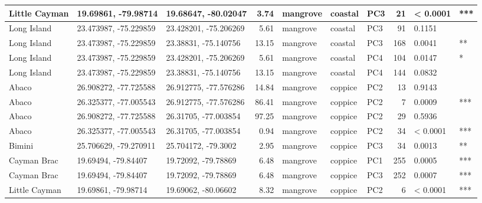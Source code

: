 \begin{tabular}{l|l|l|r|l|l|l|r|l|l}
\hline
Little Cayman & 19.69861, -79.98714 & 19.68647, -80.02047 & 3.74 & mangrove & coastal & PC3 & 21 & < 0.0001 & ***\\
\hline
Long Island & 23.473987, -75.229859 & 23.428201, -75.206269 & 5.61 & mangrove & coastal & PC3 & 91 & 0.1151 & \\
\hline
Long Island & 23.473987, -75.229859 & 23.38831, -75.140756 & 13.15 & mangrove & coastal & PC3 & 168 & 0.0041 & **\\
\hline
Long Island & 23.473987, -75.229859 & 23.428201, -75.206269 & 5.61 & mangrove & coastal & PC4 & 104 & 0.0147 & *\\
\hline
Long Island & 23.473987, -75.229859 & 23.38831, -75.140756 & 13.15 & mangrove & coastal & PC4 & 144 & 0.0832 & \\
\hline
Abaco & 26.908272, -77.725588 & 26.912775, -77.576286 & 14.84 & mangrove & coppice & PC2 & 13 & 0.9143 & \\
\hline
Abaco & 26.325377, -77.005543 & 26.912775, -77.576286 & 86.41 & mangrove & coppice & PC2 & 7 & 0.0009 & ***\\
\hline
Abaco & 26.908272, -77.725588 & 26.31705, -77.003854 & 97.25 & mangrove & coppice & PC2 & 29 & 0.5936 & \\
\hline
Abaco & 26.325377, -77.005543 & 26.31705, -77.003854 & 0.94 & mangrove & coppice & PC2 & 34 & < 0.0001 & ***\\
\hline
Bimini & 25.706629, -79.270911 & 25.704172, -79.3002 & 2.95 & mangrove & coppice & PC3 & 34 & 0.0013 & **\\
\hline
Cayman Brac & 19.69494, -79.84407 & 19.72092, -79.78869 & 6.48 & mangrove & coppice & PC1 & 255 & 0.0005 & ***\\
\hline
Cayman Brac & 19.69494, -79.84407 & 19.72092, -79.78869 & 6.48 & mangrove & coppice & PC3 & 252 & 0.0007 & ***\\
\hline
Little Cayman & 19.69861, -79.98714 & 19.69062, -80.06602 & 8.32 & mangrove & coppice & PC2 & 6 & < 0.0001 & ***\\
\hline
\end{tabular}
